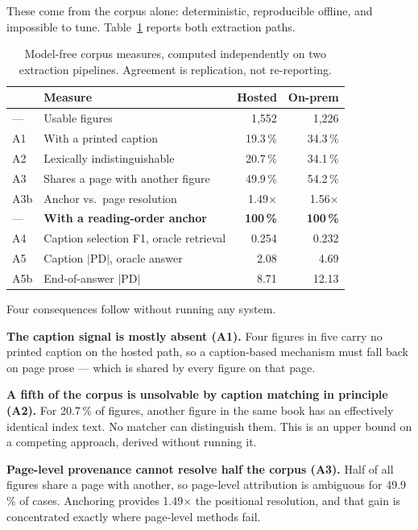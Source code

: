 \documentclass[journal]{IEEEtran}
\begin{document}
These come from the corpus alone: deterministic, reproducible offline, and
impossible to tune. Table~\ref{tab:structural} reports both extraction paths.

\begin{table}[t]
\caption{Model-free corpus measures, computed independently on two extraction
pipelines. Agreement is replication, not re-reporting.}
\label{tab:structural}
\centering
\begin{tabular}{@{}llrr@{}}
\toprule
& Measure & Hosted & On-prem \\
\midrule
--- & Usable figures & 1{,}552 & 1{,}226 \\
A1 & With a printed caption & 19.3\,\% & 34.3\,\% \\
A2 & Lexically indistinguishable & 20.7\,\% & 34.1\,\% \\
A3 & Shares a page with another figure & 49.9\,\% & 54.2\,\% \\
A3b & Anchor vs.\ page resolution & 1.49$\times$ & 1.56$\times$ \\
--- & \textbf{With a reading-order anchor} & \textbf{100\,\%} & \textbf{100\,\%} \\
A4 & Caption selection F1, oracle retrieval & 0.254 & 0.232 \\
A5 & Caption $|\mathrm{PD}|$, oracle answer & 2.08 & 4.69 \\
A5b & End-of-answer $|\mathrm{PD}|$ & 8.71 & 12.13 \\
\bottomrule
\end{tabular}
\end{table}

Four consequences follow without running any system.

\textbf{The caption signal is mostly absent (A1).} Four figures in five carry no
printed caption on the hosted path, so a caption-based mechanism must fall back on
page prose --- which is shared by every figure on that page.

\textbf{A fifth of the corpus is unsolvable by caption matching in principle
(A2).} For 20.7\,\% of figures, another figure in the same book has an effectively
identical index text. No matcher can distinguish them. This is an upper bound on a
competing approach, derived without running it.

\textbf{Page-level provenance cannot resolve half the corpus (A3).} Half of all
figures share a page with another, so page-level attribution is ambiguous for
49.9\,\% of cases. Anchoring provides 1.49$\times$ the positional resolution, and
that gain is concentrated exactly where page-level methods fail.
\end{document}
